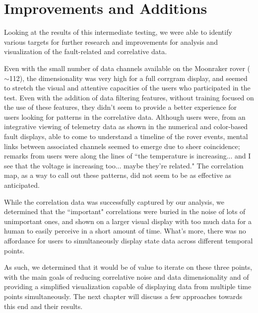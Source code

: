 \section{Improvements and Additions}

Looking at the results of this intermediate testing, we were able to identify various targets for further research and improvements for analysis and visualization of the fault-related and correlative data.

Even with the small number of data channels available on the Moonraker rover ($\sim$112), the dimensionality was very high for a full corrgram display, and seemed to stretch the visual and attentive capacities of the users who participated in the test. Even with the addition of data filtering features, without training focused on the use of these features, they didn't seem to provide a better experience for users looking for patterns in the correlative data. Although users were, from an integrative viewing of telemetry data as shown in the numerical and color-based fault displays, able to come to understand a timeline of the rover events, mental links between associated channels seemed to emerge due to sheer coincidence; remarks from users were along the lines of ``the temperature is increasing... and I see that the voltage is increasing too... maybe they're related." The correlation map, as a way to call out these patterns, did not seem to be as effective as anticipated.

While the correlation data was successfully captured by our analysis, we determined that the ``important" correlations were buried in the noise of lots of unimportant ones, and shown on a larger visual display with too much data for a human to easily perceive in a short amount of time. What's more, there was no affordance for users to simultaneously display state data across different temporal points.

As such, we determined that it would be of value to iterate on these three points, with the main goals of reducing correlative noise and data dimensionality and of providing a simplified visualization capable of displaying data from multiple time points simultaneously. The next chapter will discuss a few approaches towards this end and their results.